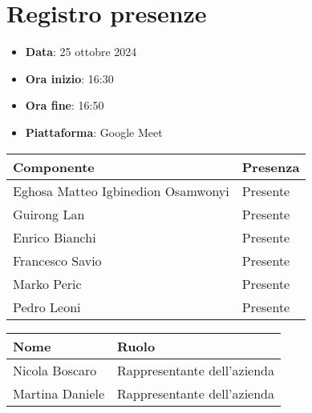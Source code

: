 \documentclass[a4paper, 12pt]{article}
\begin{document}
\section{Registro presenze}
\begin{itemize}
    \item[] \textbf{Data}: 25 ottobre 2024
    \item[] \textbf{Ora inizio}:  16:30
    \item[] \textbf{Ora fine}: 16:50
    \item[] \textbf{Piattaforma}: Google Meet	
\end{itemize}
\begin{table}[!h]
\centering
{\renewcommand{\arraystretch}{2}
\begin{tabularx}{\textwidth}{| X | X |}
    \hline
        \textbf{\large Componente} & 
        \textbf{\large Presenza} \\ 
    \hline 
    \hline
        Eghosa Matteo Igbinedion Osamwonyi&
        Presente \\
    \hline 
        Guirong Lan&
        Presente \\
    \hline 
        Enrico Bianchi&
        Presente \\
    \hline 
        Francesco Savio&
        Presente \\
    \hline 
        Marko Peric&
        Presente \\
    \hline 
        Pedro Leoni&
        Presente \\
    \hline 

\end{tabularx}}
\end{table}

\begin{table}[!h]
    \centering
    {\renewcommand{\arraystretch}{2}
    \begin{tabularx}{\textwidth}{| X | X |}
        \hline
            \textbf{\large Nome} & 
            \textbf{\large Ruolo} \\ 
        \hline 
        \hline
            Nicola Boscaro&
            Rappresentante dell'azienda \\
        \hline 
            Martina Daniele&
            Rappresentante dell'azienda \\
        \hline 
    
    \end{tabularx}}
\end{table}

\newpage
\end{document}
